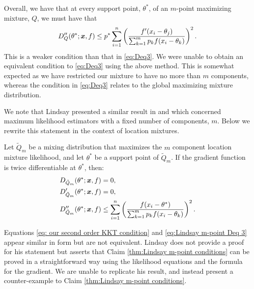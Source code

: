 	Overall, we have that at every support point, $\theta^*$, of an $m$-point maximizing mixture, $Q$, we must have that
	\begin{equation}
		D_Q''(\theta^*;{\bm{{x}}},f) \leq p^* \sum_{i = 1}^n \left(\frac{f'(x_i - \theta_j)}{\sum_{k = 1}^m p_k f(x_i - \theta_k)}\right)^2.
		\label{eq: our second order KKT condition}
	\end{equation}
	This is a weaker condition than that in \eqref{eq:Deq3}. We were unable to obtain an equivalent condition to \eqref{eq:Deq3} using the above method. This is somewhat expected as we have restricted our mixture to have no more than $m$ components, whereas the condition in \eqref{eq:Deq3} relates to the global maximizing mixture distribution.

	We note that Lindsay presented a similar result in \cite[Theorem 7.1]{Lindsay1983-tf} and \cite[Theorem 24]{Lindsay1995-sq} which concerned maximum likelihood estimators with a fixed number of components, $m$. Below we rewrite this statement in the context of location mixtures.
	\begin{claim}
	\label{thm:Lindsay m-point conditions}
		Let $\tilde{Q}_m$ be a mixing distribution that maximizes the $m$ component location mixture likelihood, and let $\theta^*$ be a support point of $\tilde{Q}_m$. If the gradient function is twice differentiable at $\theta^*$, then:
		\begin{align}
			D_{\tilde{Q}_m}(\theta^*; {\bm{{x}}}, f) &= 0,\\
			D_{\tilde{Q}_m}'(\theta^*; {\bm{{x}}}, f) &= 0,\\
			D_{\tilde{Q}_m}''(\theta^*; {\bm{{x}}}, f) &\leq \sum_{i = 1}^n \left(\frac{f(x_i - \theta^*)}{\sum_{k = 1}^m p_k f(x_i - \theta_k)}\right)^2.
			\label{eq:Lindsay m-point Deq 3}
		\end{align}
	\end{claim}

	Equations \eqref{eq: our second order KKT condition} and \eqref{eq:Lindsay m-point Deq 3} appear similar in form but are not equivalent. Lindsay does not provide a proof for his statement but asserts that Claim \ref{thm:Lindsay m-point conditions} can be proved in a straightforward way using the likelihood equations and the formula for the gradient. We are unable to replicate his result, and instead present a counter-example to Claim \ref{thm:Lindsay m-point conditions}.

